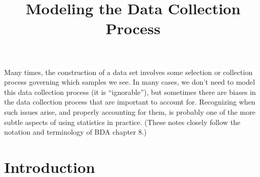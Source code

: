 \documentclass[12pt]{article}
\title{Modeling the Data Collection Process}
\author{}
\date{}
\begin{document}
\maketitle

\tableofcontents


\vspace{2em}

Many times, the construction of a data set involves some selection or collection process governing which samples we see. In many cases, we don't need to model this data collection process (it is ``ignorable''), but sometimes there are biases in the data collection process that are important to account for. Recognizing when such issues arise, and properly accounting for them, is probably one of the more subtle aspects of using statistics  in practice. (These notes closely follow the notation and terminology of BDA chapter 8.)

\newpage

\section{Introduction}
\end{document}
